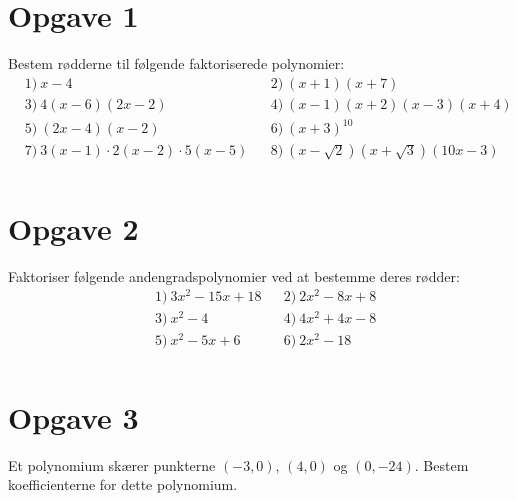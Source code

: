 \section*{Opgave 1}
Bestem rødderne til følgende faktoriserede polynomier:
\begin{align*}
&1) \  x-4  &&2) \ (x+1)(x+7)   \\
&3) \  4(x-6)(2x-2)  &&4) \ (x-1)(x+2)(x-3)(x+4)   \\
&5) \  (2x-4)(x-2)  &&6) \ (x+3)^{10}   \\
&7) \  3(x-1)\cdot 2(x-2)\cdot 5(x-5)  &&8) \ (x-\sqrt{2})(x+\sqrt{3})(10x-3)    \\
\end{align*}
\section*{Opgave 2}
Faktoriser følgende andengradspolynomier ved at bestemme deres rødder:
\begin{align*}
&1) \ 3x^2-15x+18  &&2) \ 2x^2-8x+8   \\
&3) \ x^2-4  &&4) \ 4x^2+4x-8   \\
&5) \ x^2-5x+6   &&6) \  2x^2-18  \\
\end{align*}

\section*{Opgave 3}
Et polynomium skærer punkterne $(-3,0)$, $(4,0)$ og $(0,-24)$. Bestem koefficienterne for dette polynomium. 
